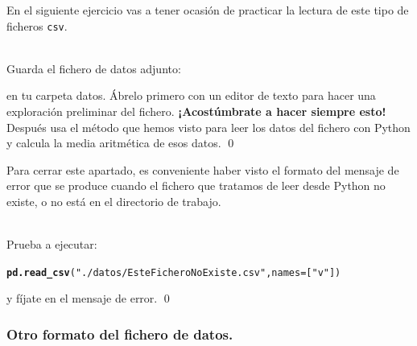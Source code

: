 \documentclass[10pt,a4paper]{article}\usepackage[]{graphicx}\usepackage[]{color}
\makeatletter
\newcommand{\hlstr}[1]{\textcolor[rgb]{0.192,0.494,0.8}{#1}}%
\newcommand{\hlkwd}[1]{\textcolor[rgb]{0.737,0.353,0.396}{\textbf{#1}}}%
\newenvironment{kframe}{%
 \def\at@end@of@kframe{}%
 \ifinner\ifhmode%
  \def\at@end@of@kframe{\end{minipage}}%
  \begin{minipage}{\columnwidth}%
 \fi\fi%
 \def\FrameCommand##1{\hskip\@totalleftmargin \hskip-\fboxsep
 \colorbox{shadecolor}{##1}\hskip-\fboxsep
     \hskip-\linewidth \hskip-\@totalleftmargin \hskip\columnwidth}%
 \MakeFramed {\advance\hsize-\width
   \@totalleftmargin\z@ \linewidth\hsize
   \@setminipage}}%
 {\par\unskip\endMakeFramed%
 \at@end@of@kframe}
\newenvironment{knitrout}{}{} %
\makeatother
\begin{document}
En el siguiente ejercicio vas a tener ocasión de practicar la lectura de este tipo de ficheros {\tt csv}.
\begin{ejercicio}
\label{tut02:ejercicio20}
\quad\\

Guarda el fichero de datos adjunto:
\begin{center}
\end{center}
en tu carpeta datos. Ábrelo primero con un editor de texto para hacer una exploración preliminar del fichero. {\bf ¡Acostúmbrate a hacer siempre esto!} Después usa el método que hemos visto para leer los datos del fichero con Python y calcula la media aritmética de esos datos.
\qed
\end{ejercicio}
Para cerrar este apartado, es conveniente haber visto el formato del mensaje de error que se produce cuando el fichero que tratamos de leer desde Python no existe, o no está en el directorio de trabajo.
\begin{ejercicio}
\label{tut02:ejercicio21}
\quad\\
Prueba a ejecutar:
\begin{knitrout}
\color{fgcolor}\begin{kframe}
\begin{alltt}
\hlkwd{pd.read_csv}(\hlstr{"./datos/EsteFicheroNoExiste.csv"}, names=[\hlstr{"v"}])
\end{alltt}
\end{kframe}
\end{knitrout}
y fíjate en el mensaje de error.
\qed
\end{ejercicio}

\subsubsection*{Otro formato del fichero de datos.}
\label{tut02:subsubsec:otroFormatoFicheroDatos}

\end{document}
